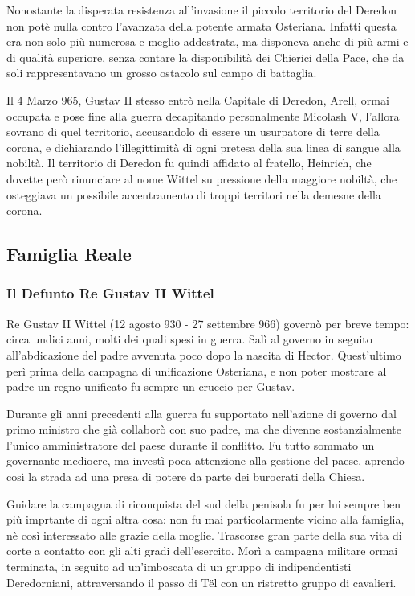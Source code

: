Nonostante la disperata resistenza all'invasione il piccolo territorio del Deredon non potè nulla contro l'avanzata della potente armata Osteriana. Infatti questa era non solo più numerosa e meglio addestrata, ma disponeva anche di più armi e di qualità superiore, senza contare la disponibilità dei Chierici della Pace, che da soli rappresentavano un grosso ostacolo sul campo di battaglia.

Il 4 Marzo 965, Gustav II stesso entrò nella Capitale di Deredon, Arell, ormai occupata e pose fine alla guerra decapitando personalmente Micolash V, l'allora sovrano di quel territorio, accusandolo di essere un usurpatore di terre della corona, e dichiarando l'illegittimità di ogni pretesa della sua linea di sangue alla nobiltà. Il territorio di Deredon fu quindi affidato al fratello, Heinrich, che dovette però rinunciare al nome Wittel su pressione della maggiore nobiltà, che osteggiava un possibile accentramento di troppi territori nella demesne della corona.


\subsection{Famiglia Reale}
\subsubsection{Il Defunto Re Gustav II Wittel}
Re Gustav II Wittel (12 agosto 930 - 27 settembre 966) governò per breve tempo: circa undici anni, molti dei quali spesi in guerra. Salì al governo in seguito all'abdicazione del padre avvenuta poco dopo la nascita di Hector. Quest'ultimo perì prima della campagna di unificazione Osteriana, e non poter mostrare al padre un regno unificato fu sempre un cruccio per Gustav.

Durante gli anni precedenti alla guerra fu supportato nell'azione di governo dal primo ministro che già collaborò con suo padre, ma che divenne sostanzialmente l'unico amministratore del paese durante il conflitto. Fu tutto sommato un governante mediocre, ma investì poca attenzione alla gestione del paese, aprendo così la strada ad una presa di potere da parte dei burocrati della Chiesa.

Guidare la campagna di riconquista del sud della penisola fu per lui sempre ben più imprtante di ogni altra cosa: non fu mai particolarmente vicino alla famiglia, nè così interessato alle grazie della moglie. Trascorse gran parte della sua vita di corte a contatto con gli alti gradi dell'esercito.
Morì a campagna militare ormai terminata, in seguito ad un'imboscata di un gruppo di indipendentisti Deredorniani, attraversando il passo di Tël con un ristretto gruppo di cavalieri.

